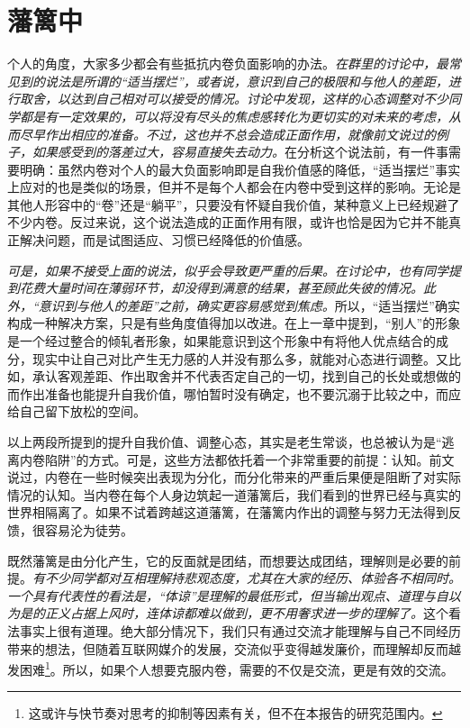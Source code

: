 \documentclass[UTF8,a4paper,fontset=windows,11pt,openany]{ctexbook}
\begin{document}
\section{藩篱中}

个人的角度，大家多少都会有些抵抗内卷负面影响的办法。\emph{在群里的讨论中，最常见到的说法是所谓的“适当摆烂”，或者说，意识到自己的极限和与他人的差距，进行取舍，以达到自己相对可以接受的情况。讨论中发现，这样的心态调整对不少同学都是有一定效果的，可以将没有尽头的焦虑感转化为更切实的对未来的考虑，从而尽早作出相应的准备。不过，这也并不总会造成正面作用，就像前文说过的例子，如果感受到的落差过大，容易直接失去动力。}在分析这个说法前，有一件事需要明确：虽然内卷对个人的最大负面影响即是自我价值感的降低，“适当摆烂”事实上应对的也是类似的场景，但并不是每个人都会在内卷中受到这样的影响。无论是其他人形容中的“卷”还是“躺平”，只要没有怀疑自我价值，某种意义上已经规避了不少内卷。反过来说，这个说法造成的正面作用有限，或许也恰是因为它并不能真正解决问题，而是试图适应、习惯已经降低的价值感。

\emph{可是，如果不接受上面的说法，似乎会导致更严重的后果。在讨论中，也有同学提到花费大量时间在薄弱环节，却没得到满意的结果，甚至顾此失彼的情况。此外，“意识到与他人的差距”之前，确实更容易感觉到焦虑。}所以，“适当摆烂”确实构成一种解决方案，只是有些角度值得加以改进。在上一章中提到，“别人”的形象是一个经过整合的倾轧者形象，如果能意识到这个形象中有将他人优点结合的成分，现实中让自己对比产生无力感的人并没有那么多，就能对心态进行调整。又比如，承认客观差距、作出取舍并不代表否定自己的一切，找到自己的长处或想做的而作出准备也能提升自我价值，哪怕暂时没有确定，也不要沉溺于比较之中，而应给自己留下放松的空间。

以上两段所提到的提升自我价值、调整心态，其实是老生常谈，也总被认为是“逃离内卷陷阱”的方式。可是，这些方法都依托着一个非常重要的前提：认知。前文说过，内卷在一些时候突出表现为分化，而分化带来的严重后果便是阻断了对实际情况的认知。当内卷在每个人身边筑起一道藩篱后，我们看到的世界已经与真实的世界相隔离了。如果不试着跨越这道藩篱，在藩篱内作出的调整与努力无法得到反馈，很容易沦为徒劳。

既然藩篱是由分化产生，它的反面就是团结，而想要达成团结，理解则是必要的前提。\emph{有不少同学都对互相理解持悲观态度，尤其在大家的经历、体验各不相同时。一个具有代表性的看法是，“体谅”是理解的最低形式，但当输出观点、道理与自以为是的正义占据上风时，连体谅都难以做到，更不用奢求进一步的理解了。}这个看法事实上很有道理。绝大部分情况下，我们只有通过交流才能理解与自己不同经历带来的想法，但随着互联网媒介的发展，交流似乎变得越发廉价，而理解却反而越发困难\footnote{这或许与快节奏对思考的抑制等因素有关，但不在本报告的研究范围内。}。所以，如果个人想要克服内卷，需要的不仅是交流，更是有效的交流。
\end{document}
